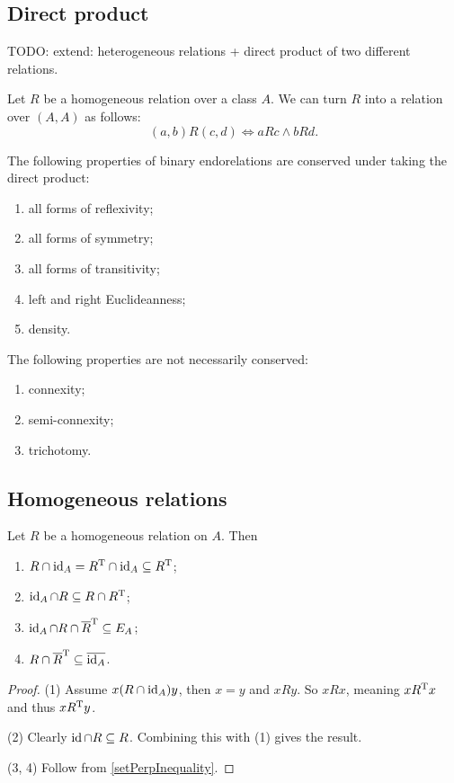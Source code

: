 \subsection{Direct product}
TODO: extend: heterogeneous relations + direct product of two different relations.
\begin{definition}
Let $R$ be a homogeneous relation over a class $A$. We can turn $R$ into a relation over $(A, A)$ as follows:
\[ (a,b)R(c,d) \iff aRc \land bRd. \]
\end{definition}
\begin{lemma} \label{relationPropertiesDirectProduct}
The following properties of binary endorelations are conserved under taking the direct product:
\begin{enumerate}
\item all forms of reflexivity;
\item all forms of symmetry;
\item all forms of transitivity;
\item left and right Euclideanness;
\item density.
\end{enumerate}
The following properties are not necessarily conserved:
\begin{enumerate}
\item connexity;
\item semi-connexity;
\item trichotomy.
\end{enumerate}
\end{lemma}

\subsection{Homogeneous relations}
\begin{lemma} \label{selfRelatedElements}
Let $R$ be a homogeneous relation on $A$. Then
\begin{enumerate}
\item $R\cap \operatorname{id}_A = R^{\mathrm{T}}\cap \operatorname{id}_A \subseteq R^{\mathrm{T}}$;
\item $\operatorname{id}_A \cap R \subseteq R\cap R^{\mathrm{T}}$;
\item $\operatorname{id}_A \cap R\cap \overline{R}^{\mathrm{T}} \subseteq E_A$;
\item $R\cap \overline{R}^{\mathrm{T}} \subseteq \overline{\operatorname{id}_A}$.
\end{enumerate}
\end{lemma}
\begin{proof}
(1) Assume $x(R\cap \operatorname{id}_A)y$, then $x=y$ and $xRy$. So $xRx$, meaning $xR^{\mathrm{T}} x$ and thus $xR^{\mathrm{T}} y$.

(2) Clearly $\operatorname{id} \cap R \subseteq R$. Combining this with (1) gives the result.

(3, 4) Follow from \ref{setPerpInequality}.
\end{proof}

